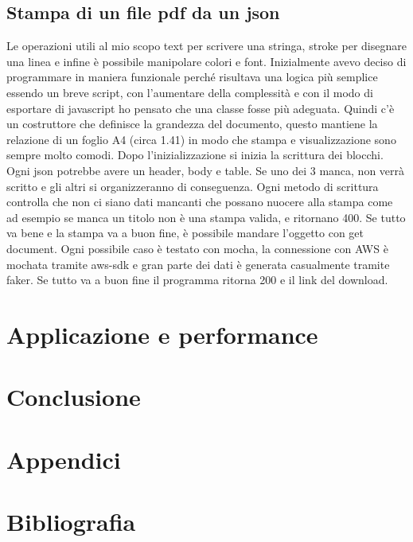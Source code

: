 \documentclass[12pt]{article}
\begin{document}
\subsection{Stampa di un file pdf da un json}
Le operazioni utili al mio scopo text per scrivere una stringa,
stroke per disegnare una linea e infine è possibile manipolare colori e font.
Inizialmente avevo deciso di programmare in maniera funzionale perché risultava
una logica più semplice essendo un breve script, con l'aumentare della complessità
e con il modo di esportare di javascript ho pensato che una classe fosse più adeguata.
Quindi c'è un costruttore che definisce la grandezza del documento, questo mantiene
la relazione di un foglio A4 (circa 1.41) in modo che stampa e visualizzazione sono
sempre molto comodi. Dopo l'inizializzazione si inizia la scrittura dei blocchi.
Ogni json potrebbe avere un header, body e table. Se uno dei 3 manca, non verrà
scritto e gli altri si organizzeranno di conseguenza. Ogni metodo di scrittura
controlla che non ci siano dati mancanti che possano nuocere alla stampa come ad
esempio se manca un titolo non è una stampa valida, e ritornano 400. Se tutto va
bene e la stampa va a buon fine, è possibile mandare l'oggetto con get document.
Ogni possibile caso è testato con mocha, la connessione con AWS è mochata tramite
aws-sdk e gran parte dei dati è generata casualmente tramite faker.
Se tutto va a buon fine il programma ritorna 200 e il link del download.

\section{Applicazione e performance}
\section{Conclusione}
\section{Appendici}
\section{Bibliografia}
\end{document}

